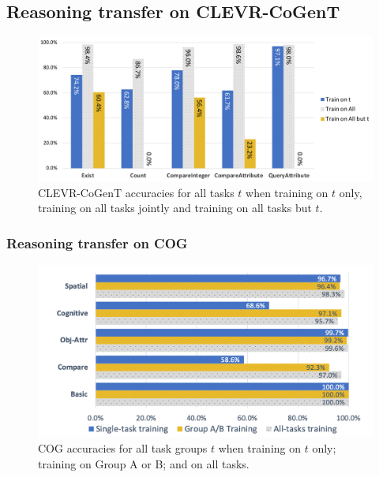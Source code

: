 \newpage
\subsection{Reasoning transfer on CLEVR-CoGenT}

\begin{figure}[htbp]
	\centering
	\includegraphics[width=\columnwidth]{../results/CoGenT_results_new.pdf}
	\caption{CLEVR-CoGenT accuracies for all tasks $t$ when training on $t$ only, training on all tasks jointly and training on all tasks but $t$.} %
	\label{fig:CoGenT-results}
\end{figure}



\newpage
\subsubsection{Reasoning transfer on COG}


\begin{figure}[htbp]
	\centering
	\includegraphics[width=\columnwidth]{../results/COG_reasoning_transfer_v3}
	\caption{COG accuracies for all task groups $t$ when training on $t$ only; training on Group A or B; and on all tasks.}
	\label{fig:COG-reasoning-results}
\end{figure}
